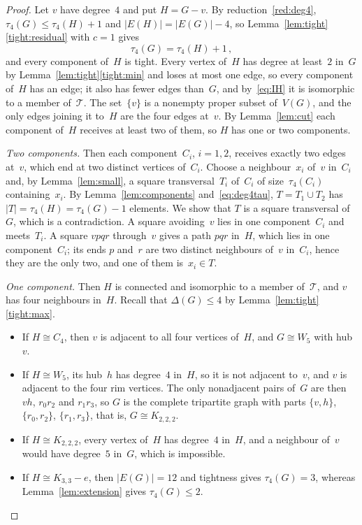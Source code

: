 \documentclass[11pt,letterpaper]{article}
\numberwithin{equation}{section}
\theoremstyle{plain}
\theoremstyle{definition}
\theoremstyle{remark}
\newcommand{\Kme}{K_{3,3}-e}
\newcommand{\Oct}{K_{2,2,2}}
\newcommand{\Tfam}{\mathcal{T}}
\begin{document}
\begin{proof}
Let $v$ have degree~$4$ and put $H=G-v$. By reduction~\ref{red:deg4}, $\tau_4(G)\le\tau_4(H)+1$ and $|E(H)|=|E(G)|-4$, so Lemma~\ref{lem:tight}\ref{tight:residual} with $c=1$ gives
\begin{equation}\label{eq:deg4tau}
\tau_4(G)=\tau_4(H)+1\,,
\end{equation}
and every component of~$H$ is tight. Every vertex of~$H$ has degree at least~$2$ in~$G$ by Lemma~\ref{lem:tight}\ref{tight:min} and loses at most one edge, so every component of~$H$ has an edge; it also has fewer edges than~$G$, and by~\eqref{eq:IH} it is isomorphic to a member of~$\Tfam$. The set~$\{v\}$ is a nonempty proper subset of~$V(G)$, and the only edges joining it to~$H$ are the four edges at~$v$. By Lemma~\ref{lem:cut} each component of~$H$ receives at least two of them, so $H$ has one or two components.

\emph{Two components.} Then each component~$C_i$, $i=1,2$, receives exactly two edges at~$v$, which end at two distinct vertices of~$C_i$. Choose a neighbour~$x_i$ of~$v$ in~$C_i$ and, by Lemma~\ref{lem:small}, a square transversal~$T_i$ of~$C_i$ of size~$\tau_4(C_i)$ containing~$x_i$. By Lemma~\ref{lem:components} and~\eqref{eq:deg4tau}, $T=T_1\cup T_2$ has $|T|=\tau_4(H)=\tau_4(G)-1$ elements. We show that $T$ is a square transversal of~$G$, which is a contradiction. A square avoiding~$v$ lies in one component~$C_i$ and meets~$T_i$. A square $vpqr$ through~$v$ gives a path $pqr$ in~$H$, which lies in one component~$C_i$; its ends $p$ and~$r$ are two distinct neighbours of~$v$ in~$C_i$, hence they are the only two, and one of them is~$x_i\in T$.

\emph{One component.} Then $H$ is connected and isomorphic to a member of~$\Tfam$, and $v$ has four neighbours in~$H$. Recall that $\Delta(G)\le4$ by Lemma~\ref{lem:tight}\ref{tight:max}.
\begin{itemize}
\item If $H\cong C_4$, then $v$ is adjacent to all four vertices of~$H$, and $G\cong W_5$ with hub~$v$.
\item If $H\cong W_5$, its hub~$h$ has degree~$4$ in~$H$, so it is not adjacent to~$v$, and $v$ is adjacent to the four rim vertices. The only nonadjacent pairs of~$G$ are then $vh$, $r_0r_2$ and $r_1r_3$, so $G$ is the complete tripartite graph with parts $\{v,h\}$, $\{r_0,r_2\}$, $\{r_1,r_3\}$, that is, $G\cong\Oct$.
\item If $H\cong\Oct$, every vertex of~$H$ has degree~$4$ in~$H$, and a neighbour of~$v$ would have degree~$5$ in~$G$, which is impossible.
\item If $H\cong\Kme$, then $|E(G)|=12$ and tightness gives $\tau_4(G)=3$, whereas Lemma~\ref{lem:extension} gives $\tau_4(G)\le2$. \qedhere
\end{itemize}
\end{proof}
\end{document}
